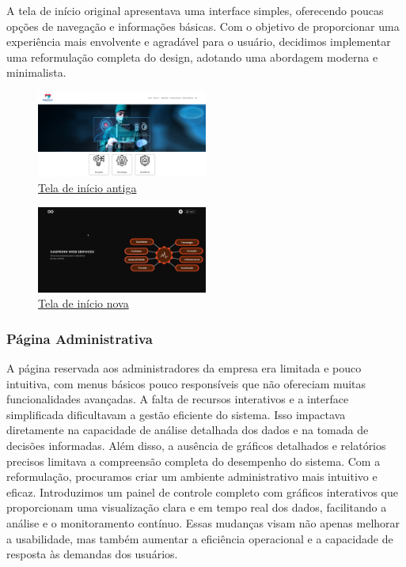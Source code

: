 \documentclass[conference, a4paper, 12pt]{IEEEtran}
\begin{document}
A tela de início original apresentava uma interface simples, oferecendo poucas opções de navegação e informações básicas. Com o objetivo de proporcionar uma experiência mais envolvente e agradável para o usuário, decidimos implementar uma reformulação completa do design, adotando uma abordagem moderna e minimalista.
\begin{figure}[H]
  \begin{center}
    \includegraphics[width=0.5\textwidth]{home_antiga.png}
    \caption{\href{https://github.com/Lucas-LPG/gws/blob/develop/report/images/home_antiga.png}{Tela de início antiga}}
  \end{center}
\end{figure}

\begin{figure}[H]
  \begin{center}
    \includegraphics[width=0.5\textwidth]{home_principal.png}
    \caption{\href{https://github.com/Lucas-LPG/gws/blob/develop/report/images/home_principal.png}{Tela de início nova}}
  \end{center}
\end{figure}

\vspace{50pt}
\subsubsection{Página Administrativa}

A página reservada aos administradores da empresa era limitada e pouco intuitiva, com menus básicos pouco responsíveis que não ofereciam muitas funcionalidades avançadas. A falta de recursos interativos e a interface simplificada dificultavam a gestão eficiente do sistema. Isso impactava diretamente na capacidade de análise detalhada dos dados e na tomada de decisões informadas. Além disso, a ausência de gráficos detalhados e relatórios precisos limitava a compreensão completa do desempenho do sistema. Com a reformulação, procuramos criar um ambiente administrativo mais intuitivo e eficaz. Introduzimos um painel de controle completo com gráficos interativos que proporcionam uma visualização clara e em tempo real dos dados, facilitando a análise e o monitoramento contínuo. Essas mudanças visam não apenas melhorar a usabilidade, mas também aumentar a eficiência operacional e a capacidade de resposta às demandas dos usuários.
\vspace{10pt}
\end{document}
